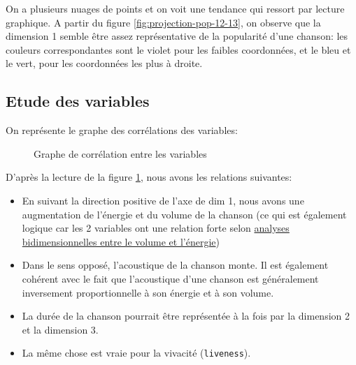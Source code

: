 \documentclass[
  11pt,
  xcolor = usenames,dvipsnames]{article}
\newcommand{\passthrough}[1]{#1}
\providecommand{\tightlist}{%
  \setlength{\itemsep}{0pt}\setlength{\parskip}{0pt}}
\begin{document}
On a plusieurs nuages de points et on voit une tendance qui ressort par lecture graphique. A partir du figure
\ref{fig:projection-pop-12-13}, on observe que la dimension 1 semble être assez représentative de la popularité d'une chanson:
les couleurs correspondantes sont le violet pour les faibles coordonnées, et le bleu et le vert, pour les coordonnées les plus à droite.

\hypertarget{etude-des-variables}{%
\subsection{Etude des variables}\label{etude-des-variables}}

On représente le graphe des corrélations des variables:

\begin{figure}

{\centering {}

}

\caption{Graphe de corrélation entre les variables}\label{fig:corvar-acp-12-13}
\end{figure}

D'après la lecture de la figure \ref{fig:corvar-acp-12-13}, nous avons les relations suivantes:

\begin{itemize}
\tightlist
\item
  En suivant la direction positive de l'axe de dim 1, nous avons une augmentation de l'énergie et du volume de la chanson (ce qui est également logique car les 2 variables ont une relation forte selon \protect\hyperlink{volume-energy}{analyses bidimensionnelles entre le volume et l'énergie})
\item
  Dans le sens opposé, l'acoustique de la chanson monte. Il est également cohérent avec le fait que l'acoustique d'une chanson est généralement inversement proportionnelle à son énergie et à son volume.
\item
  La durée de la chanson pourrait être représentée à la fois par la dimension 2 et la dimension 3.
\item
  La même chose est vraie pour la vivacité (\passthrough{\lstinline!liveness!}).
\end{itemize}
\end{document}
